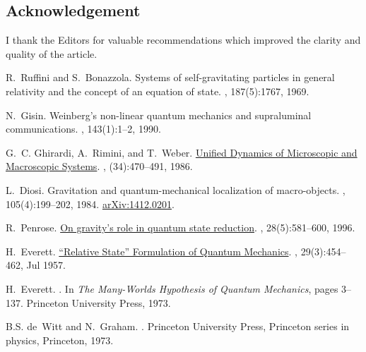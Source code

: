 \documentclass[11pt]{amsart}
\theoremstyle{definition}
\theoremstyle{plain}
\begin{document}
\subsection*{Acknowledgement}

I thank the Editors for valuable recommendations which improved the clarity and quality of the article.

\begin{thebibliography}{10}

R.~Ruffini and S.~Bonazzola.
\newblock Systems of self-gravitating particles in general relativity and the
  concept of an equation of state.
, 187(5):1767, 1969.

N.~Gisin.
\newblock Weinberg's non-linear quantum mechanics and supraluminal
  communications.
, 143(1):1--2, 1990.

G.~C. Ghirardi, A.~Rimini, and T.~Weber.
\newblock
  \href{https://www.researchgate.net/profile/Giancarlo\_Ghirardi/publication/224043655\_Unified\_Dynamics\_for\_Microscopic\_and\_Macroscopic\_Systems/links/0c960518ba67033416000000.pdf}{Unified
  Dynamics of Microscopic and Macroscopic Systems}.
, (34):470--491, 1986.

L.~Diosi.
\newblock Gravitation and quantum-mechanical localization of macro-objects.
, 105(4):199--202, 1984.
\newblock \href{http://arxiv.org/abs/1412.0201}{arXiv:1412.0201}.

R.~Penrose.
\newblock
  \href{http://blog.sciencenet.cn/upload/blog/file/2010/8/201081019170575880.pdf}{On
  gravity's role in quantum state reduction}.
, 28(5):581--600, 1996.

H.~Everett.
\newblock
  \href{http://stanford.library.usyd.edu.au/entries/qm-everett/}{``Relative
  State'' Formulation of Quantum Mechanics}.
, 29(3):454--462, Jul 1957.

H.~Everett.
.
\newblock In {\em {The Many-Worlds Hypothesis of Quantum Mechanics}}, pages
  3--137. Princeton University Press, 1973.

B.S. de~Witt and N.~Graham.
.
\newblock Princeton University Press, Princeton series in physics, Princeton,
  1973.


\end{thebibliography}
\end{document}
